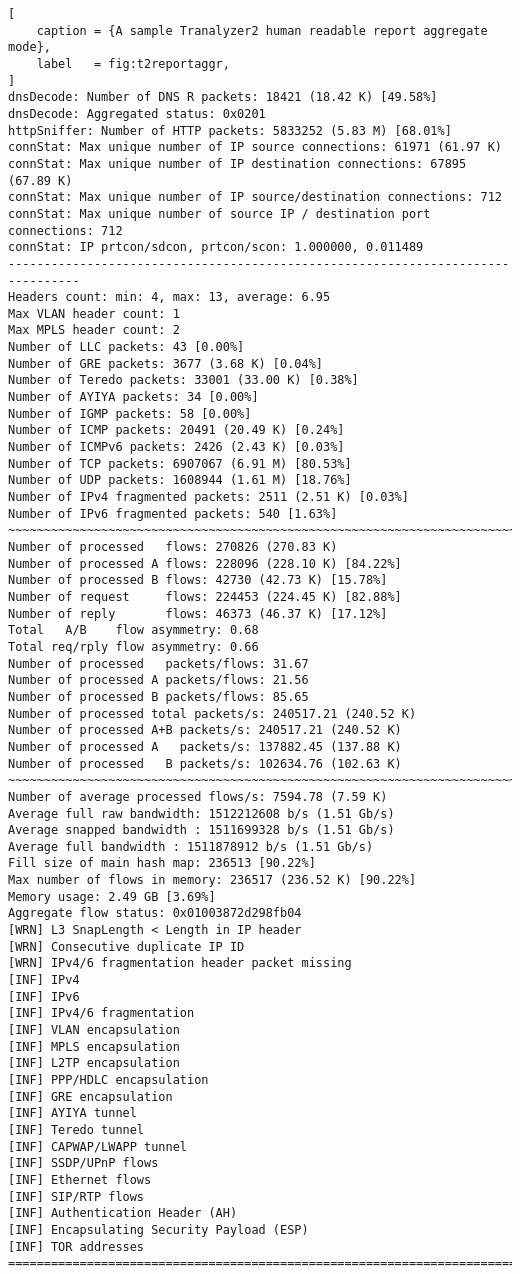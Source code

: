 \begin{lstlisting}[
    caption = {A sample Tranalyzer2 human readable report aggregate mode},
    label   = fig:t2reportaggr,
]
dnsDecode: Number of DNS R packets: 18421 (18.42 K) [49.58%]
dnsDecode: Aggregated status: 0x0201
httpSniffer: Number of HTTP packets: 5833252 (5.83 M) [68.01%]
connStat: Max unique number of IP source connections: 61971 (61.97 K)
connStat: Max unique number of IP destination connections: 67895 (67.89 K)
connStat: Max unique number of IP source/destination connections: 712
connStat: Max unique number of source IP / destination port connections: 712
connStat: IP prtcon/sdcon, prtcon/scon: 1.000000, 0.011489
--------------------------------------------------------------------------------
Headers count: min: 4, max: 13, average: 6.95
Max VLAN header count: 1
Max MPLS header count: 2
Number of LLC packets: 43 [0.00%]
Number of GRE packets: 3677 (3.68 K) [0.04%]
Number of Teredo packets: 33001 (33.00 K) [0.38%]
Number of AYIYA packets: 34 [0.00%]
Number of IGMP packets: 58 [0.00%]
Number of ICMP packets: 20491 (20.49 K) [0.24%]
Number of ICMPv6 packets: 2426 (2.43 K) [0.03%]
Number of TCP packets: 6907067 (6.91 M) [80.53%]
Number of UDP packets: 1608944 (1.61 M) [18.76%]
Number of IPv4 fragmented packets: 2511 (2.51 K) [0.03%]
Number of IPv6 fragmented packets: 540 [1.63%]
~~~~~~~~~~~~~~~~~~~~~~~~~~~~~~~~~~~~~~~~~~~~~~~~~~~~~~~~~~~~~~~~~~~~~~~~~~~~~~~~
Number of processed   flows: 270826 (270.83 K)
Number of processed A flows: 228096 (228.10 K) [84.22%]
Number of processed B flows: 42730 (42.73 K) [15.78%]
Number of request     flows: 224453 (224.45 K) [82.88%]
Number of reply       flows: 46373 (46.37 K) [17.12%]
Total   A/B    flow asymmetry: 0.68
Total req/rply flow asymmetry: 0.66
Number of processed   packets/flows: 31.67
Number of processed A packets/flows: 21.56
Number of processed B packets/flows: 85.65
Number of processed total packets/s: 240517.21 (240.52 K)
Number of processed A+B packets/s: 240517.21 (240.52 K)
Number of processed A   packets/s: 137882.45 (137.88 K)
Number of processed   B packets/s: 102634.76 (102.63 K)
~~~~~~~~~~~~~~~~~~~~~~~~~~~~~~~~~~~~~~~~~~~~~~~~~~~~~~~~~~~~~~~~~~~~~~~~~~~~~~~~
Number of average processed flows/s: 7594.78 (7.59 K)
Average full raw bandwidth: 1512212608 b/s (1.51 Gb/s)
Average snapped bandwidth : 1511699328 b/s (1.51 Gb/s)
Average full bandwidth : 1511878912 b/s (1.51 Gb/s)
Fill size of main hash map: 236513 [90.22%]
Max number of flows in memory: 236517 (236.52 K) [90.22%]
Memory usage: 2.49 GB [3.69%]
Aggregate flow status: 0x01003872d298fb04
[WRN] L3 SnapLength < Length in IP header
[WRN] Consecutive duplicate IP ID
[WRN] IPv4/6 fragmentation header packet missing
[INF] IPv4
[INF] IPv6
[INF] IPv4/6 fragmentation
[INF] VLAN encapsulation
[INF] MPLS encapsulation
[INF] L2TP encapsulation
[INF] PPP/HDLC encapsulation
[INF] GRE encapsulation
[INF] AYIYA tunnel
[INF] Teredo tunnel
[INF] CAPWAP/LWAPP tunnel
[INF] SSDP/UPnP flows
[INF] Ethernet flows
[INF] SIP/RTP flows
[INF] Authentication Header (AH)
[INF] Encapsulating Security Payload (ESP)
[INF] TOR addresses
================================================================================
\end{lstlisting}

